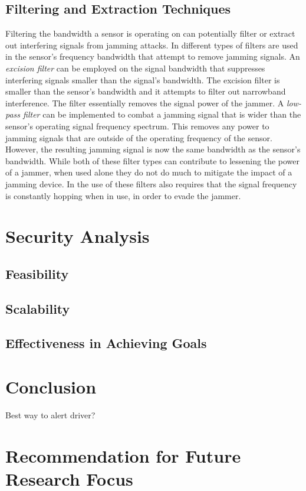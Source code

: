 \documentclass[conference]{IEEEtran}
\begin{document}
\subsection{Filtering and Extraction Techniques}
Filtering the bandwidth a sensor is operating on can potentially filter or extract out interfering signals from jamming attacks. In \cite{5} different types of filters are used in the sensor's frequency bandwidth that attempt to remove jamming signals.
An \textit{excision filter} can be employed on the signal bandwidth that suppresses interfering signals smaller than the signal's bandwidth. The excision filter is smaller than the sensor's bandwidth and it attempts to filter out narrowband interference. The filter essentially removes the signal power of the jammer\cite{5}. %
A \textit{low-pass filter} can be implemented to combat a jamming signal that is wider than the sensor's operating signal frequency spectrum. This removes any power to jamming signals that are outside of the operating frequency of the sensor. However, the resulting jamming signal is now the same bandwidth as the sensor's bandwidth. 
While both of these filter types can contribute to lessening the power of a jammer, when used alone they do not do much to mitigate the impact of a jamming device. In \cite{5} the use of these filters also requires that the signal frequency is constantly hopping when in use, in order to evade the jammer. 
\section{Security Analysis}
\subsection{Feasibility}
\subsection{Scalability}
\subsection{Effectiveness in Achieving Goals}
\section{Conclusion}
Best way to alert driver?

\section{Recommendation for Future Research Focus}
\end{document}
